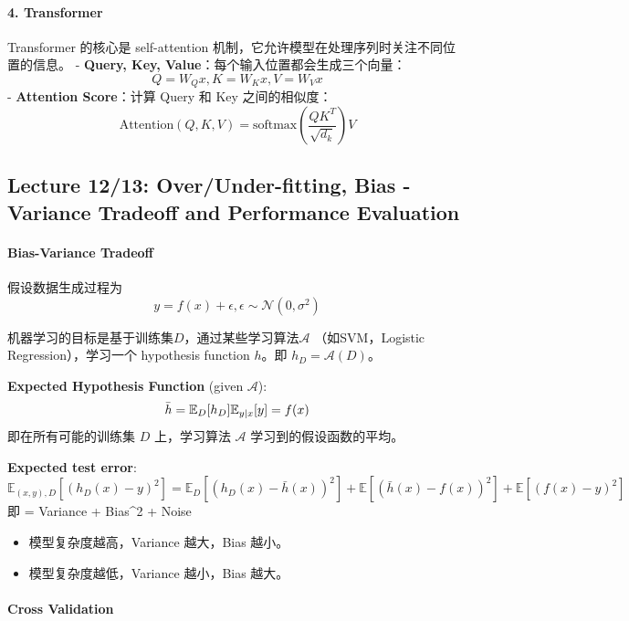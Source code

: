 \documentclass[
]{ctexart}
\providecommand{\tightlist}{%
  \setlength{\itemsep}{0pt}\setlength{\parskip}{0pt}}
\begin{document}
\paragraph{4. Transformer}\label{transformer}

Transformer 的核心是 self-attention
机制，它允许模型在处理序列时关注不同位置的信息。 - \textbf{Query, Key,
Value}：每个输入位置都会生成三个向量：
\[Q = W_Q x, K = W_K x, V = W_V x\] - \textbf{Attention Score}：计算
Query 和 Key 之间的相似度：
\[\text{Attention}(Q, K, V) = \text{softmax}\left(\frac{QK^T}{\sqrt{d_k}}\right) V\]


\clearpage

\subsection{Lecture 12/13: Over/Under-fitting, Bias - Variance
Tradeoff and Performance
Evaluation}\label{lecture-1213-overunder-fitting-bias---variance-tradeoff-and-performance-evaluation}

\paragraph{Bias-Variance Tradeoff}\label{bias-variance-tradeoff}

假设数据生成过程为
\[y = f(x) + \epsilon, \epsilon \sim \mathcal{N}(0, \sigma^2)\]

机器学习的目标是基于训练集\(D\)，通过某些学习算法\(\mathcal{A}\)
（如SVM，Logistic Regression），学习一个 hypothesis function \(h\)。即
\(h_D = \mathcal{A}(D)\)。

\textbf{Expected Hypothesis Function} (given \(\mathcal{A}\)):
\[\bar{h} = \mathbb{E}_D[h_D]\\
\mathbb{E}_{y|x}[y] = f(x)\] 即在所有可能的训练集 \(D\) 上，学习算法
\(\mathcal{A}\) 学习到的假设函数的平均。

\textbf{Expected test error}:
\[\mathbb{E}_{(x,y),D}[(h_D(x)-y)^2] = \mathbb{E}_D[(h_D(x)-\bar{h}(x))^2] + \mathbb{E} [(\bar{h}(x)-f(x))^2] + \mathbb{E}[(f(x)-y)^2]\]
即 = Variance + Bias\^{}2 + Noise

\begin{itemize}
\tightlist
\item
  模型复杂度越高，Variance 越大，Bias 越小。
\item
  模型复杂度越低，Variance 越小，Bias 越大。
\end{itemize}

\paragraph{Cross Validation}\label{cross-validation}
\end{document}
